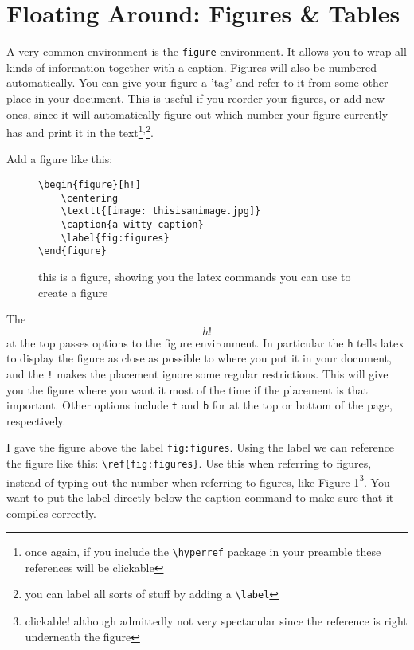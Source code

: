 \section{Floating Around: Figures \& Tables}

A very common environment is the \texttt{figure} environment. It allows you to wrap all kinds of information together with a caption. Figures will also be numbered automatically. You can give your figure a 'tag' and refer to it from some other place in your document. This is useful if you reorder your figures, or add new ones, since it will automatically figure out which number your figure currently has and print it in the text\footnote{once again, if you include the \texttt{\textbackslash hyperref} package in your preamble these references will be clickable}$^,$\footnote{you can label all sorts of stuff by adding a \texttt{\textbackslash label}}.

Add a figure like this:

\begin{figure}[h!]
\centering
\begin{verbatim}
\begin{figure}[h!]
    \centering
    \texttt{[image: thisisanimage.jpg]}
    \caption{a witty caption}
    \label{fig:figures}
\end{figure}    
\end{verbatim}
\caption{this is a figure, showing you the latex commands you can use to create a figure}
\label{fig:figures}
\end{figure}

The \texttt{\[h!\]} at the top passes options to the figure environment. In particular the \texttt{h} tells latex to display the figure as close as possible to where you put it in your document, and the \texttt{!} makes the placement ignore some regular restrictions. This will give you the figure where you want it most of the time if the placement is that important. Other options include \texttt{t} and \texttt{b} for at the top or bottom of the page, respectively.

I gave the figure above the label \texttt{fig:figures}. Using the label we can reference the figure like this: \texttt{\textbackslash ref\{fig:figures\}}. Use this when referring to figures, instead of typing out the number when referring to figures, like Figure \ref{fig:figures}\footnote{clickable! although admittedly not very spectacular since the reference is right underneath the figure}. You want to put the label directly below the caption command to make sure that it compiles correctly.




